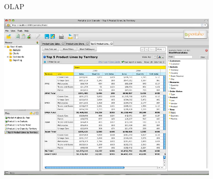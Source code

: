 \documentclass{beamer}
\begin{document}
\begin{frame}{OLAP}
    \begin{center}
        \includegraphics[width=0.8\textwidth]{analyzer.png}
    \end{center}
\end{frame}
%
\end{document}

